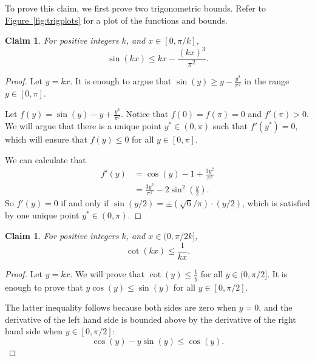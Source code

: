 \documentclass[11pt]{article}
\numberwithin{equation}{section}
\newtheorem{claim}[theorem]{Claim}
\theoremstyle{definition}
\theoremstyle{plain}
\newcommand{\expref}[2]{\hyperref[#2]{#1~\ref{#2}}}
\begin{document}
To prove this claim, we first prove two trigonometric bounds. Refer to \expref{Figure}{fig:trigplots} for a plot of the functions and bounds.

\begin{claim}
    \label{claim:center1}
    For positive integers $k$, and $x\in[0,\pi/k]$,
    \[\sin(kx)\le kx-\frac{(kx)^3}{\pi^2}. \]
\end{claim}

\begin{proof}
    Let $y=kx$. It is enough to argue that $\sin(y)\ge y-\frac{y^3}{\pi^2}$ in the range $y\in[0,\pi]$.
    
    Let $f(y)=\sin(y)-y+\frac{y^3}{\pi^2}$. Notice that $f(0)=f(\pi)=0$ and $f'(\pi)>0$. We will argue that there is a unique point $y^*\in (0,\pi)$ such that $f'(y^*)=0$, which will ensure that $f(y)\le 0$ for all $y\in [0,\pi]$.
    
    We can calculate that 
    \begin{align*}
        f'(y) &= \cos(y)-1+\frac{3y^2}{\pi^2}\\
        &= \frac{3y^2}{\pi^2}-2\sin^2\left(\frac{y}{2}\right).
    \end{align*}
    So $f'(y)=0$ if and only if $\sin(y/2)= \pm (\sqrt{6}/\pi)\cdot (y/2)$, which is satisfied by one unique point $y^*\in(0,\pi)$.
\end{proof}

\begin{claim}
    \label{claim:center2}
    For positive integers $k$, and $x\in (0,\pi/2k]$, 
    \[\cot(kx)\le \frac{1}{kx}. \]
\end{claim}

\begin{proof}
    Let $y=kx$. We will prove that $\cot(y)\le \frac{1}{y}$ for all $y\in (0,\pi/2]$. It is enough to prove that $y\cos(y)\le \sin(y)$ for all $y\in [0,\pi/2]$.
    
    The latter inequality follows because both sides are zero when $y=0$, and the derivative of the left hand side is bounded above by the derivative of the right hand side when $y\in [0,\pi/2]$:
    \[\cos(y)-y\sin(y)\le \cos(y).  \]
\end{proof}
\end{document}
